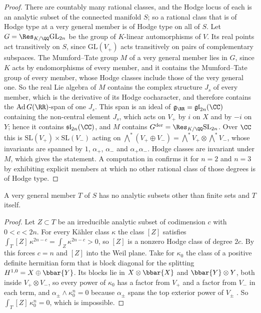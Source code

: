 \begin{proof}
There are countably many rational classes, and the Hodge locus of each is an
analytic subset of the connected manifold $S$; so a rational class that is of
Hodge type at a very general member is of Hodge type on all of $S$.
Let $G=\Res_{K/\QQ}\mathrm{GL}_{2n}$ be the group of $K$-linear automorphisms
of $V$. Its real points act transitively on $S$, since
$\mathrm{GL}(V_{+})$ acts transitively on pairs of complementary subspaces.
The Mumford--Tate group $M$ of a very general member lies in $G$, since $K$
acts by endomorphisms of every member, and it contains the Mumford--Tate group
of every member, whose Hodge classes include those of the very general one.
So the real Lie algebra of $M$ contains the complex structure $J_{s}$ of every
member, which is the derivative of its Hodge cocharacter, and therefore
contains the $\mathrm{Ad}\,G(\RR)$-span of one $J_{s}$. This span is an ideal of
$\mathfrak{g}_{\RR}=\mathfrak{gl}_{2n}(\CC)$ containing the non-central
element $J_{s}$, which acts on $V_{+}$ by $i$ on $X$ and by $-i$ on $Y$; hence
it contains $\mathfrak{sl}_{2n}(\CC)$, and $M$ contains
$G^{\mathrm{der}}=\Res_{K/\QQ}\mathrm{SL}_{2n}$. Over $\CC$ this is
$\mathrm{SL}(V_{+})\times\mathrm{SL}(V_{-})$ acting on
$\bigwedge^{*}(V_{+}\oplus V_{-})=\bigwedge^{*}V_{+}\otimes\bigwedge^{*}V_{-}$,
whose invariants are spanned by $1$, $\alpha_{+}$, $\alpha_{-}$ and
$\alpha_{+}\alpha_{-}$. Hodge classes are invariant under $M$, which gives
the statement. A computation in \cite{BMB26} confirms it for $n=2$
and $n=3$ by exhibiting explicit members at which no other rational class of
those degrees is of Hodge type.
\end{proof}

\begin{lemma}
\label{lem:weiltorussubsets}
A very general member $T$ of $S$ has no analytic subsets other than finite
sets and $T$ itself.
\end{lemma}

\begin{proof}
Let $Z\subset T$ be an irreducible analytic subset of codimension $c$ with
$0<c<2n$. For every K\"ahler class $\kappa$ the class $[Z]$ satisfies
$\int_{T}[Z]\,\kappa^{2n-c}=\int_{Z}\kappa^{2n-c}>0$, so $[Z]$ is a nonzero
Hodge class of degree $2c$. By  this forces $c=n$ and
$[Z]$ into the Weil plane. Take for $\kappa_{0}$ the class of a positive
definite hermitian form that is block diagonal for the splitting
$H^{1,0}=X\oplus\bbar{Y}$. Its blocks lie in $X\otimes\bbar{X}$ and
$\bbar{Y}\otimes Y$, both inside $V_{+}\otimes V_{-}$, so every power of
$\kappa_{0}$ has a factor from $V_{+}$ and a factor from $V_{-}$ in each term,
and $\alpha_{\pm}\wedge\kappa_{0}^{n}=0$ because $\alpha_{\pm}$ spans the top
exterior power of $V_{\pm}$ \cite{BMB26}. So
$\int_{T}[Z]\,\kappa_{0}^{n}=0$, which is impossible.
\end{proof}

